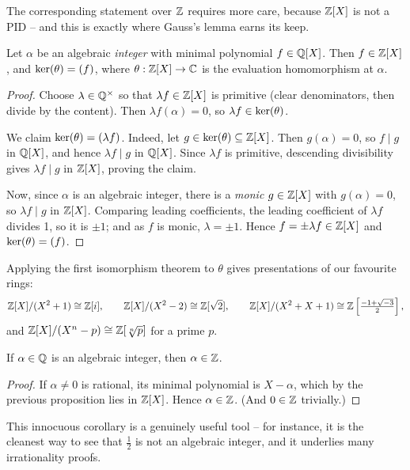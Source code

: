 \documentclass[a4paper]{scrartcl}
\begin{document}
The corresponding statement over $\mathbb{Z}$ requires more care, because $\mathbb{Z}[X]$ is not a PID -- and this is exactly where Gauss's lemma earns its keep.

\begin{proposition}
	Let $\alpha$ be an algebraic \emph{integer} with minimal polynomial $f \in \mathbb{Q}[X]$. Then $f \in \mathbb{Z}[X]$, and $\operatorname{ker}(\theta) = (f)$, where $\theta: \mathbb{Z}[X] \rightarrow \mathbb{C}$ is the evaluation homomorphism at $\alpha$.
\end{proposition}
\begin{proof}
	Choose $\lambda \in \mathbb{Q}^{\times}$ so that $\lambda f \in \mathbb{Z}[X]$ is primitive (clear denominators, then divide by the content). Then $\lambda f(\alpha) = 0$, so $\lambda f \in \operatorname{ker}(\theta)$.

	We claim $\operatorname{ker}(\theta) = (\lambda f)$. Indeed, let $g \in \operatorname{ker}(\theta) \subseteq \mathbb{Z}[X]$. Then $g(\alpha) = 0$, so $f \mid g$ in $\mathbb{Q}[X]$, and hence $\lambda f \mid g$ in $\mathbb{Q}[X]$. Since $\lambda f$ is primitive, descending divisibility gives $\lambda f \mid g$ in $\mathbb{Z}[X]$, proving the claim.

	Now, since $\alpha$ is an algebraic integer, there is a \emph{monic} $g \in \mathbb{Z}[X]$ with $g(\alpha) = 0$, so $\lambda f \mid g$ in $\mathbb{Z}[X]$. Comparing leading coefficients, the leading coefficient of $\lambda f$ divides 1, so it is $\pm 1$; and as $f$ is monic, $\lambda = \pm 1$. Hence $f = \pm \lambda f \in \mathbb{Z}[X]$ and $\operatorname{ker}(\theta) = (f)$.
\end{proof}

Applying the first isomorphism theorem to $\theta$ gives presentations of our favourite rings:
$$
\mathbb{Z}[X]/(X^2 + 1) \cong \mathbb{Z}[i], \qquad \mathbb{Z}[X]/(X^2 - 2) \cong \mathbb{Z}[\sqrt 2], \qquad \mathbb{Z}[X]/(X^2 + X + 1) \cong \mathbb{Z}\left[\tfrac{-1 + \sqrt{-3}}{2}\right],
$$
and $\mathbb{Z}[X]/(X^n - p) \cong \mathbb{Z}[\sqrt[n]{p}]$ for a prime $p$.

\begin{corollary}
	If $\alpha \in \mathbb{Q}$ is an algebraic integer, then $\alpha \in \mathbb{Z}$.
\end{corollary}
\begin{proof}
	If $\alpha \neq 0$ is rational, its minimal polynomial is $X - \alpha$, which by the previous proposition lies in $\mathbb{Z}[X]$. Hence $\alpha \in \mathbb{Z}$. (And $0 \in \mathbb{Z}$ trivially.)
\end{proof}

This innocuous corollary is a genuinely useful tool -- for instance, it is the cleanest way to see that $\frac{1}{2}$ is not an algebraic integer, and it underlies many irrationality proofs.
\end{document}
